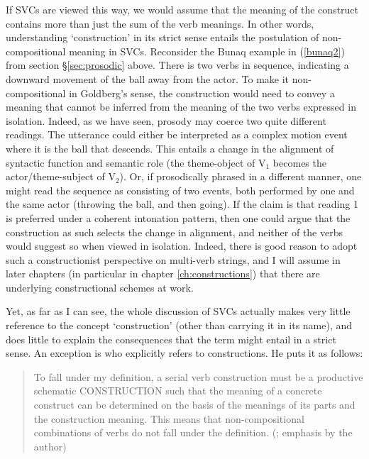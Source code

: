 If SVCs are viewed this way, we would assume that the meaning of the construct contains more than just the sum of the verb meanings. In other words, understanding `construction' in its strict sense entails the postulation of non-compositional meaning in SVCs. Reconsider the Bunaq example in (\ref{bunaq2}) from section §\ref{sec:prosodic} above. There is two verbs in sequence, indicating a downward movement of the ball away from the actor. To make it non-compositional in Goldberg's sense, the construction would need to convey a meaning that cannot be inferred from the meaning of the two verbs expressed in isolation. Indeed, as we have seen, prosody may coerce two quite different readings. The utterance could either be interpreted as a complex motion event where it is the ball that descends. This entails a change in the alignment of syntactic function and semantic role (the theme-object of V$_1$ becomes the actor/theme-subject of V$_2$). Or, if prosodically phrased in a different manner, one might read the sequence as consisting of two events, both performed by one and the same actor (throwing the ball, and then going). If the claim is that reading 1 is preferred under a coherent intonation pattern, then one could argue that the construction as such selects the change in alignment, and neither of the verbs would suggest so when viewed in isolation. Indeed, there is good reason to adopt such a constructionist perspective on multi-verb strings, and I will assume in later chapters (in particular in chapter \ref{ch:constructions}) that there are underlying constructional schemes at work.

Yet, as far as I can see, the whole discussion of SVCs actually makes very little reference to the concept `construction' (other than carrying it in its name), and does little to explain the consequences that the term might entail in a strict sense. An exception is \citet{haspelmath2016serial} who explicitly refers to constructions. He puts it as follows:

\begin{quote}To fall under my definition, a serial verb construction must be a productive schematic
CONSTRUCTION such that the meaning of a concrete construct can be determined on the basis of the meanings of its parts and the construction meaning. This means that non-compositional combinations of verbs do not fall under the definition. (\citealt[6]{haspelmath2016serial}; emphasis by the author) \end{quote}

